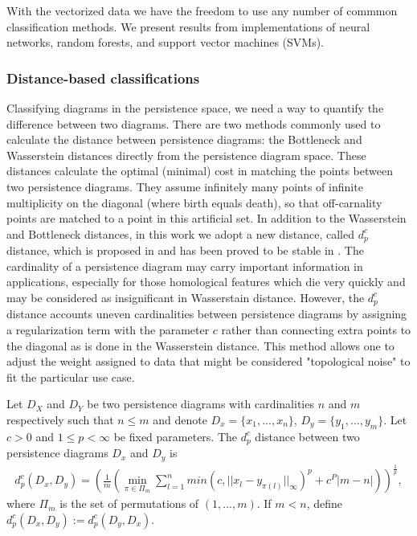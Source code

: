\documentclass[10pt]{article}
\newenvironment{definition}[2][Definition]{\begin{trivlist}
\item[\hskip \labelsep {\bfseries #1}\hskip \labelsep {\bfseries #2.}]}{\end{trivlist}}
\begin{document}
With the vectorized data we have the freedom to use any number of commmon classification methods. We present results from implementations of neural networks, random forests, and support vector machines (SVMs).

\subsubsection{Distance-based classifications}

Classifying diagrams in the persistence space, we need a way to quantify the difference between two diagrams. There are two methods commonly used to calculate the distance between persistence diagrams: the Bottleneck and Wasserstein distances \cite{adams2017persistence,bubenik2015statistical,edelsbrunner2010computational,kerber2017geometry,wasserman2018topological} directly from the persistence diagram space. These distances calculate the optimal (minimal) cost in matching the points between two persistence diagrams. They assume infinitely many points of infinite multiplicity on the diagonal (where birth equals death), so that off-carnality points are matched to a point in this artificial set. In addition to the Wasserstein and Bottleneck distances, in this work we adopt a new distance, called $d^c_p$ distance, which is proposed in \cite{marchese2018signal} and has been proved to be stable in \cite{maroulas2018stable}. The cardinality of a persistence diagram may carry important information in applications, especially for those homological features which die very quickly and may be considered as insignificant in Wasserstain distance. However, the $d^c_p$ distance accounts uneven cardinalities between persistence diagrams by assigning a regularization term with the parameter $c$ rather than connecting extra points to the diagonal as is done in the Wasserstein distance. This method allows one to adjust the weight assigned to data that might be considered "topological noise" to fit the particular use case.

\begin{definition}{1}
Let $D_X$ and $D_Y$ be two persistence diagrams with cardinalities $n$ and $m$ respectively such that $n \leq m$ and denote $D_x=\{ x_1,...,x_n \}$, $D_y=\{ y_1,...,y_m \}$. Let $c>0$ and $1\leq p <\infty$ be fixed parameters. The $d^c_p$ distance between two persistence diagrams $D_x$ and $D_y$ is
\begin{align}
    d^c_p(D_x,D_y)= \left( \frac{1}{m} \left( \min_{\pi \in \Pi_m} \sum^n_{l=1} min(c,||x_l-y_{\pi(l)}||_\infty)^p+c^P|m-n|  \right) \right)^{\frac{1}{p}},
    \label{eq:dpcdistance}
\end{align}
where $\Pi_m$ is the set of permutations of $(1,...,m)$. If $m<n$, define $d^c_p(D_x,D_y):=d^c_p(D_y,D_x)$.
\end{definition}
\end{document}
